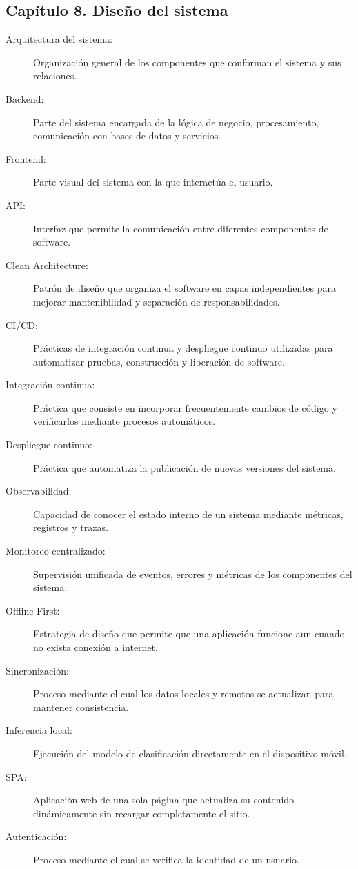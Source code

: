 \subsection*{Capítulo 8. Diseño del sistema}
\begin{description}
    \item[Arquitectura del sistema:] Organización general de los componentes que conforman el sistema y sus relaciones.
    \item[Backend:] Parte del sistema encargada de la lógica de negocio, procesamiento, comunicación con bases de datos y servicios.
    \item[Frontend:] Parte visual del sistema con la que interactúa el usuario.
    \item[API:] Interfaz que permite la comunicación entre diferentes componentes de software.
    \item[Clean Architecture:] Patrón de diseño que organiza el software en capas independientes para mejorar mantenibilidad y separación de responsabilidades.
    \item[CI/CD:] Prácticas de integración continua y despliegue continuo utilizadas para automatizar pruebas, construcción y liberación de software.
    \item[Integración continua:] Práctica que consiste en incorporar frecuentemente cambios de código y verificarlos mediante procesos automáticos.
    \item[Despliegue continuo:] Práctica que automatiza la publicación de nuevas versiones del sistema.
    \item[Observabilidad:] Capacidad de conocer el estado interno de un sistema mediante métricas, registros y trazas.
    \item[Monitoreo centralizado:] Supervisión unificada de eventos, errores y métricas de los componentes del sistema.
    \item[Offline-First:] Estrategia de diseño que permite que una aplicación funcione aun cuando no exista conexión a internet.
    \item[Sincronización:] Proceso mediante el cual los datos locales y remotos se actualizan para mantener consistencia.
    \item[Inferencia local:] Ejecución del modelo de clasificación directamente en el dispositivo móvil.
    \item[SPA:] Aplicación web de una sola página que actualiza su contenido dinámicamente sin recargar completamente el sitio.
    \item[Autenticación:] Proceso mediante el cual se verifica la identidad de un usuario.

\end{description}
